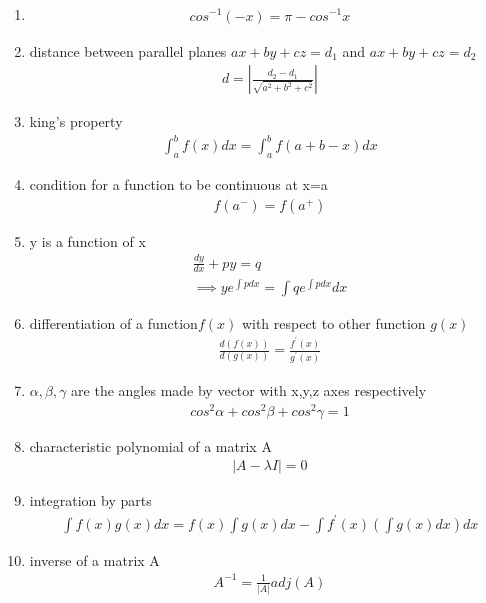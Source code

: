 \documentclass[]{article}
\begin{document}
\begin{enumerate}[label=\thesubsection.\arabic*, ref=\thesubsection.\theenumi]
\item 
\begin{align}
    cos^{-1}(-x)=\pi - cos^{-1}x \label{eq:ee26btech11222-prob 14}
\end{align}
 \item distance between parallel planes $ax+by+cz=d_1$ and $ax+by+cz=d_2$
 \begin{align}
     d=\left | \frac{d_2-d_1}{\sqrt{a^2+b^2+c^2}}\right |
 \end{align}
 \item king's property
 \begin{align}
     \int_a^b f(x)dx= \int_a^b f(a+b-x)dx \label{eq:ee26btech11222-prob 16}
 \end{align}
 \item condition for a function to be continuous at x=a
 \begin{align}
     f(a^-)=f(a^+) \label{eq:ee26btech11222-prob 18}
 \end{align}
 \item y is a function of x
 \begin{align}
     \frac{dy}{dx}+py=q \\ \implies ye^{\int pdx}= \int q  e^{\int pdx}dx \label{eq:ee26btech11222-prob 19}
 \end{align} \newpage 
 \item differentiation of a function$f(x)$ with respect to other function $g(x)$
 \begin{align}
     \frac{d(f(x))}{d(g(x))}=\frac{f^\prime (x)}{g^\prime (x)} \label{eq:ee26btech11222-prob 20}
 \end{align}
 \item $\alpha ,\beta, \gamma $ are the angles made by vector with x,y,z axes respectively 
 \begin{align} 
     cos^2\alpha+ cos^2\beta+cos^2\gamma=1 \label{eq:ee26btech11222-prob 21}
 \end{align}
 \item characteristic polynomial of a matrix A
 \begin{align}
    |A-\lambda I|=0 \label{eq:ee26btech11222-prob 22} 
 \end{align}
 \item integration by parts 
 \begin{align}
     \int f(x)g(x)dx=f(x)\int g(x)dx-\int f^\prime (x)\left(\int g(x)dx\right) dx \label{eq:ee26btech11222-prob 29}
 \end{align}
 \item inverse of a matrix A
 \begin{align}
     A^{-1}= \frac{1}{\vert{}A\vert{}}adj(A) \label{eq:ee26btech11222-prob }
 \end{align}


\end{enumerate}
\end{document}
